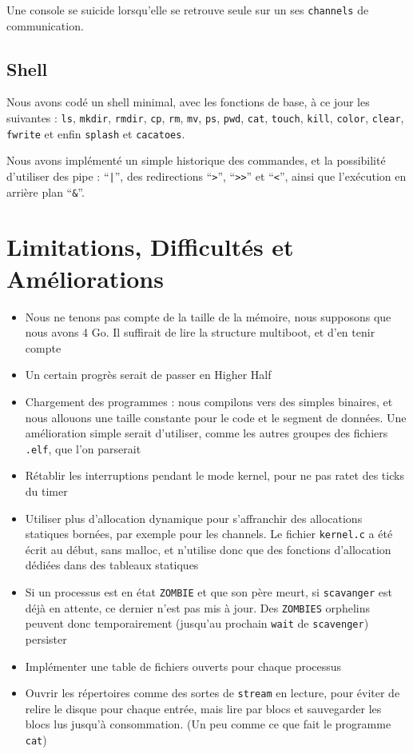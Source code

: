 \documentclass[a4paper,10pt, french]{article}
\newcommand{\code}[1]{\texttt{#1}}
\begin{document}
Une console se suicide lorsqu'elle se retrouve seule sur un ses \code{channels} de communication.

\subsection{Shell}
Nous avons codé un shell minimal, avec les fonctions de base, à ce jour les suivantes : \code{ls},
\code{mkdir}, \code{rmdir}, \code{cp}, \code{rm}, \code{mv}, \code{ps}, \code{pwd}, \code{cat},
\code{touch}, \code{kill}, \code{color}, \code{clear}, \code{fwrite} et enfin \code{splash} et \code{cacatoes}.

Nous avons implémenté un simple historique des commandes, et la possibilité d'utiliser des pipe : ``\code{|}'',
des redirections ``\code{>}'', ``\code{>>}'' et ``\code{<}'', ainsi que l'exécution en arrière 
plan ``\code{\&}''.

\section{Limitations, Difficultés et Améliorations}
\begin{itemize}
 \item Nous ne tenons pas compte de la taille de la mémoire, nous supposons que nous avons 4 Go.
 Il suffirait de lire la structure multiboot, et d'en tenir compte
 \item Un certain progrès serait de passer en Higher Half
 \item Chargement des programmes : nous compilons vers des simples binaires, et nous allouons une 
 taille constante pour le code et le segment de données. Une amélioration simple serait
 d'utiliser, comme les autres groupes des fichiers \code{.elf}, que l'on parserait
 \item Rétablir les interruptions pendant le mode kernel, pour ne pas ratet des ticks du timer
 \item Utiliser plus d'allocation dynamique pour s'affranchir des allocations statiques bornées, par exemple pour les channels. Le fichier
 \code{kernel.c} a été écrit au début, sans malloc, et n'utilise donc que des fonctions d'allocation dédiées dans des tableaux statiques
 \item Si un processus est en état \code{ZOMBIE} et que son père meurt, si \code{scavanger} est 
 déjà en attente, ce dernier n'est pas mis à jour. Des \code{ZOMBIES} orphelins peuvent donc temporairement (jusqu'au prochain \code{wait} de \code{scavenger}) persister
 \item Implémenter une table de fichiers ouverts pour chaque processus
 \item Ouvrir les répertoires comme des sortes de \code{stream} en lecture, pour éviter de relire le disque pour chaque
 entrée, mais lire par blocs et sauvegarder les blocs lus jusqu'à consommation. (Un peu comme ce que fait le
 programme \code{cat})
\end{itemize}
\end{document}
